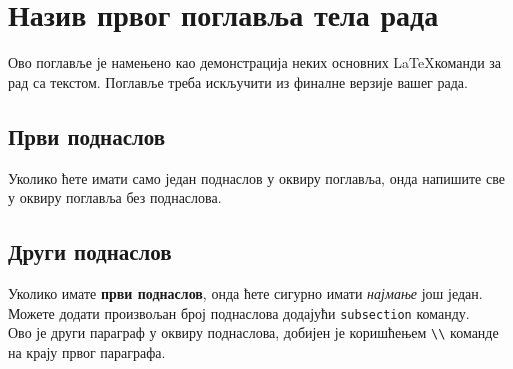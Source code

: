 
\section{Назив првог поглавља тела рада}
Ово поглавље је намењено као демонстрација неких основних \LaTeX команди за рад са текстом. Поглавље треба искључити из финалне верзије вашег рада.

\subsection{Први поднаслов}
Уколико ћете имати само један поднаслов у оквиру поглавља, онда напишите све у оквиру поглавља без поднаслова.

\subsection{Други поднаслов}
Уколико имате \textbf{први поднаслов}, онда ћете сигурно имати \textit{најмање} још један. Можете додати произвољан број поднаслова додајући \texttt{subsection} команду.\\

Ово је други параграф у оквиру поднаслова, добијен је коришћењем \texttt{\textbackslash\textbackslash} команде на крају првог параграфа.

